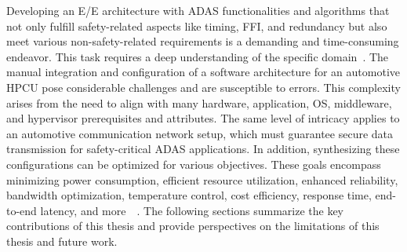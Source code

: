     
    Developing an E/E architecture with ADAS functionalities and algorithms that not only fulfill safety-related aspects like timing, FFI, and redundancy but also meet various non-safety-related requirements is a demanding and time-consuming endeavor. This task requires a deep understanding of the specific domain~\cite{9565115,9212001}.
    The manual integration and configuration of a software architecture for an automotive HPCU pose considerable challenges and are susceptible to errors. This complexity arises from the need to align with many hardware, application, OS, middleware, and hypervisor prerequisites and attributes. The same level of intricacy applies to an automotive communication network setup, which must guarantee secure data transmission for safety-critical ADAS applications.
    In addition, synthesizing these configurations can be optimized for various objectives. These goals encompass minimizing power consumption, efficient resource utilization, enhanced reliability, bandwidth optimization, temperature control, cost efficiency, response time, end-to-end latency, and more~~\cite{askaripoor2022architecture,9212001,askaripoor2023designer}. The following sections summarize the key contributions of this thesis and provide perspectives on the limitations of this thesis and future work.
    
    
    
    
    
   

